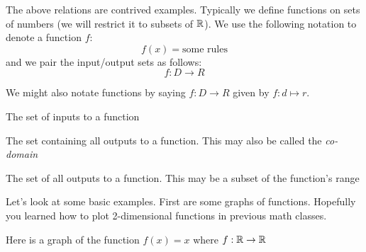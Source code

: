\documentclass[main.tex]{subfiles}
\begin{document}
The above relations are contrived examples. Typically we define functions on sets of numbers (we will restrict it to subsets of \(\mathbb{R}\)). We use the following notation to denote a function \(f\): \[f(x) = \text{some rules}\] and we pair the input/output sets as follows: \[f : D \rightarrow R\]

We might also notate functions by saying \(f : D \rightarrow R\) given by \(f : d \mapsto r\).

\begin{defn}
	The set of inputs to a function
\end{defn}

\begin{defn}
	The set containing all outputs to a function. This may also be called the \textit{co-domain}
\end{defn}

\begin{defn}
	The set of all outputs to a function. This may be a subset of the function's range
\end{defn}

Let's look at some basic examples. First are some graphs of functions. Hopefully you learned how to plot 2-dimensional functions in previous math classes.

\begin{example}
	Here is a graph of the function \(f(x) = x\) where \(f : \mathbb{R} \rightarrow \mathbb{R}\)
	
	\begin{center}
	\end{center}
\end{example}
\end{document}

